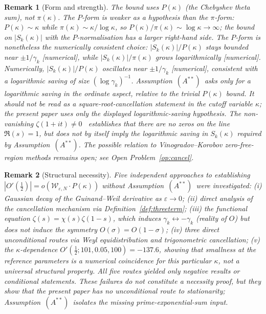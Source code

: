 \documentclass[11pt]{article}
\newtheorem*{remark}{Remark}
\newcommand{\Wgamma}{\mathcal{W}_{\varepsilon,N}}   %
\newcommand{\Astar}{\ensuremath{(A^{**})}}  %
\begin{document}
\begin{remark}[Form and strength]
\label{rem:strength}
The bound uses $P(\kappa)$ (the Chebyshev theta sum),
not $\pi(\kappa)$.
The $P$-form is \emph{weaker} as a hypothesis than the $\pi$-form:
$P(\kappa)\sim\kappa$ while $\pi(\kappa)\sim\kappa/\log\kappa$,
so $P(\kappa)/\pi(\kappa)\sim\log\kappa\to\infty$;
the bound on $|S_k(\kappa)|$ with the $P$-normalisation has a larger right-hand side.
The $P$-form is nonetheless the numerically consistent choice:
$|S_k(\kappa)|/P(\kappa)$ stays bounded near $\pm 1/\gamma_k$
[numerical], while $|S_k(\kappa)|/\pi(\kappa)$ grows logarithmically [numerical].
Numerically, $|S_k(\kappa)|/P(\kappa)$ oscillates near $\pm 1/\gamma_k$
[numerical], consistent with a logarithmic saving of size $(\log\gamma_k)^{-1}$.
Assumption~\Astar\ asks only for a logarithmic saving in the
ordinate aspect, relative to the trivial $P(\kappa)$ bound.
It should not be read as a square-root-cancellation statement
in the cutoff variable $\kappa$; the present paper uses only the
displayed logarithmic-saving hypothesis.
The non-vanishing $\zeta(1+it)\ne 0$~\cite{Hadamard,dlVP} establishes
that there are no zeros on the line $\Re(s)=1$, but does not by itself
imply the logarithmic saving in $S_k(\kappa)$ required by
Assumption~\Astar.
The possible relation to Vinogradov--Korobov zero-free-region methods
\cite{MossinghoffTrudgianYang24,Bellotti24a}
remains open; see Open Problem~\ref{op:cancel}.
\end{remark}

\begin{remark}[Structural necessity]
\label{rem:necessity}
Five independent approaches to establishing
$|O'(\tfrac12)|=o(\Wgamma\cdot P(\kappa))$ without
Assumption~\Astar\ were investigated:
(i) Gaussian decay of the Guinand--Weil derivative as $\varepsilon\to 0$;
(ii) direct analysis of the cancellation mechanism via
     Definition~\ref{def:threeterm};
(iii) the functional equation $\zeta(s)=\chi(s)\zeta(1-s)$, which
     induces $\gamma_k\leftrightarrow-\gamma_k$ (reality of $O$) but does
     not induce the symmetry $O(\sigma)=O(1-\sigma)$;
(iv) three direct unconditional routes via Weyl equidistribution and
     trigonometric cancellation;
(v) the $\kappa$-dependence $O'(\tfrac12;101,0.05,100)=-137.6$, showing
     that smallness at the reference parameters is a numerical coincidence
     for this particular $\kappa$, not a universal structural property.
All five routes yielded only negative results or conditional statements.
These failures do not constitute a necessity proof, but they show that
the present paper has no unconditional route to stationarity;
Assumption~\Astar\ isolates the missing prime-exponential-sum input.
\end{remark}
\end{document}
